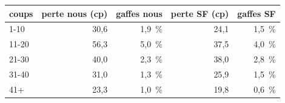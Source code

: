 \begin{tabular}{lrrrr}
\toprule
coups & perte nous (cp) & gaffes nous & perte SF (cp) & gaffes SF\\
\midrule
1-10 & 30{,}6 & 1{,}9~\% & 24{,}1 & 1{,}5~\%\\
11-20 & 56{,}3 & 5{,}0~\% & 37{,}5 & 4{,}0~\%\\
21-30 & 40{,}0 & 2{,}3~\% & 38{,}0 & 2{,}8~\%\\
31-40 & 31{,}0 & 1{,}3~\% & 25{,}9 & 1{,}5~\%\\
41+ & 23{,}3 & 1{,}0~\% & 19{,}8 & 0{,}6~\%\\
\bottomrule
\end{tabular}
